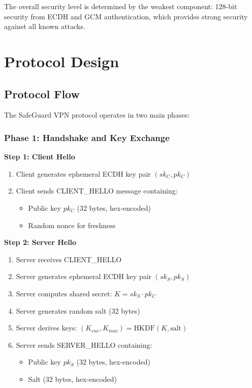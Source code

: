 \documentclass[12pt,a4paper]{article}
\begin{document}
The overall security level is determined by the weakest component: 128-bit security from ECDH and GCM authentication, which provides strong security against all known attacks.

\section{Protocol Design}

\subsection{Protocol Flow}

The SafeGuard VPN protocol operates in two main phases:

\subsubsection{Phase 1: Handshake and Key Exchange}

\textbf{Step 1: Client Hello}
\begin{enumerate}
    \item Client generates ephemeral ECDH key pair $(sk_C, pk_C)$
    \item Client sends CLIENT\_HELLO message containing:
    \begin{itemize}
        \item Public key $pk_C$ (32 bytes, hex-encoded)
        \item Random nonce for freshness
    \end{itemize}
\end{enumerate}

\textbf{Step 2: Server Hello}
\begin{enumerate}
    \item Server receives CLIENT\_HELLO
    \item Server generates ephemeral ECDH key pair $(sk_S, pk_S)$
    \item Server computes shared secret: $K = sk_S \cdot pk_C$
    \item Server generates random salt (32 bytes)
    \item Server derives keys: $(K_{enc}, K_{mac}) = \text{HKDF}(K, \text{salt})$
    \item Server sends SERVER\_HELLO containing:
    \begin{itemize}
        \item Public key $pk_S$ (32 bytes, hex-encoded)
        \item Salt (32 bytes, hex-encoded)
    \end{itemize}
\end{enumerate}
\end{document}
